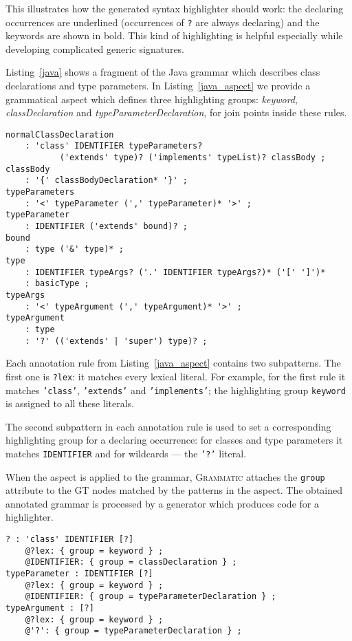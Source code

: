 \documentclass{IOS-Book-Article}     %
\newcommand{\lstref}[1]{Listing~\ref{#1}}
\newcommand{\tool}[1]{\textsc{#1}}
\newcommand{\Grammatic}[0]{\tool{Grammatic}}
\begin{document}
This illustrates how the generated syntax highlighter should work: the declaring occurrences are underlined (occurrences of \texttt{?} are always declaring) and the keywords are shown in bold. This kind of highlighting is helpful especially while developing complicated generic signatures.

\lstref{java} shows a fragment of the Java grammar \cite{JLS} which describes class declarations and type parameters. In \lstref{java_aspect} we provide a grammatical aspect which defines three highlighting groups: \emph{keyword}, \emph{classDeclaration} and \emph{typeParameterDeclaration}, for join points inside these rules.

\begin{lstlisting}[language=Grammatic,caption=Class declaration syntax in Java 5,label=java,float]
normalClassDeclaration
	: 'class' IDENTIFIER typeParameters? 
           ('extends' type)? ('implements' typeList)? classBody ;
classBody
	: '{' classBodyDeclaration* '}' ;
typeParameters
	: '<' typeParameter (',' typeParameter)* '>' ;
typeParameter
	: IDENTIFIER ('extends' bound)? ;
bound
	: type ('&' type)* ;
type
	: IDENTIFIER typeArgs? ('.' IDENTIFIER typeArgs?)* ('[' ']')*
	: basicType ;
typeArgs
	: '<' typeArgument (',' typeArgument)* '>' ;
typeArgument
	: type
	: '?' (('extends' | 'super') type)? ;
\end{lstlisting}

\lstset{language=Grammatic}
Each annotation rule from \lstref{java_aspect} contains two subpatterns. The first one is \texttt{?lex}: it matches every lexical literal. For example, for the first rule it matches \texttt{'class'}, \texttt{'extends'} and \texttt{'implements'}; the highlighting group \texttt{keyword} is assigned to all these literals.

The second subpattern in each annotation rule is used to set a corresponding highlighting group for a declaring occurrence: for classes and type parameters it matches \texttt{IDENTIFIER} and for wildcards --- the \texttt{'?'} literal.

When the aspect is applied to the grammar, \Grammatic{} attaches the \texttt{group} attribute to the GT nodes matched by the patterns in the aspect. The obtained annotated grammar is processed by a generator which produces code for a highlighter.

\begin{lstlisting}[language=Grammatic,caption=Highlighting aspect for class declarations in Java,float,label=java_aspect]
? : 'class' IDENTIFIER [?]
	@?lex: { group = keyword } ;
	@IDENTIFIER: { group = classDeclaration } ;
typeParameter : IDENTIFIER [?]
	@?lex: { group = keyword } ;
	@IDENTIFIER: { group = typeParameterDeclaration } ;
typeArgument : [?]
	@?lex: { group = keyword } ;
	@'?': { group = typeParameterDeclaration } ;
\end{lstlisting}
\end{document}
